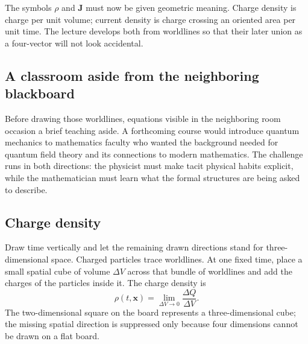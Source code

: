 The symbols \(\rho\) and \(\mathbf J\) must now be given geometric meaning.
Charge density is charge per unit volume; current density is charge crossing
an oriented area per unit time.  The lecture develops both from worldlines
so that their later union as a four-vector will not look accidental.

\subsection{A classroom aside from the neighboring blackboard}

Before drawing those worldlines, equations visible in the neighboring room
occasion a brief teaching aside.  A forthcoming course would introduce
quantum mechanics to mathematics faculty who wanted the background needed
for quantum field theory and its connections to modern mathematics.  The
challenge runs in both directions: the physicist must make tacit physical
habits explicit, while the mathematician must learn what the formal
structures are being asked to describe.

\begin{classroomqa}
\end{classroomqa}

\subsection{Charge density}

Draw time vertically and let the remaining drawn directions stand for
three-dimensional space.  Charged particles trace worldlines.  At one fixed
time, place a small spatial cube of volume \(\Delta V\) across that bundle
of worldlines and add the charges of the particles inside it.  The charge
density is
\begin{equation}
\rho(t,\mathbf x)
=
\lim_{\Delta V\to0}
\frac{\Delta Q}{\Delta V}.
\label{eq:charge-density}
\end{equation}
The two-dimensional square on the board represents a three-dimensional
cube; the missing spatial direction is suppressed only because four
dimensions cannot be drawn on a flat board.

